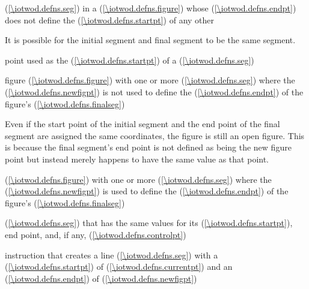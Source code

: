 %
 (\ref{\iotwod.defns.seg}) in a  (\ref{\iotwod.defns.figure}) whose  (\ref{\iotwod.defns.endpt}) does not define the  (\ref{\iotwod.defns.startpt}) of any other 
\begin{note}
It is possible for the initial segment and final segment to be the same segment.
\end{note}

%
point used as the  (\ref{\iotwod.defns.startpt}) of a  (\ref{\iotwod.defns.seg})

%
figure (\ref{\iotwod.defns.figure}) with one or more  (\ref{\iotwod.defns.seg}) where the  (\ref{\iotwod.defns.newfigpt}) is not used to define the  (\ref{\iotwod.defns.endpt}) of the figure's  (\ref{\iotwod.defns.finalseg})
\begin{note}
Even if the start point of the initial segment and the end point of the final segment are assigned the same coordinates, the figure is still an open figure. This is because the final segment's end point is not defined as being the new figure point but instead merely happens to have the same value as that point.
\end{note}

%
 (\ref{\iotwod.defns.figure}) with one or more  (\ref{\iotwod.defns.seg}) where the  (\ref{\iotwod.defns.newfigpt}) is used to define the  (\ref{\iotwod.defns.endpt}) of the figure's  (\ref{\iotwod.defns.finalseg})

%
 (\ref{\iotwod.defns.seg}) that has the same values for its  (\ref{\iotwod.defns.startpt}), end point, and, if any,  (\ref{\iotwod.defns.controlpt})

%
 instruction that creates a line  (\ref{\iotwod.defns.seg}) with a  (\ref{\iotwod.defns.startpt}) of  (\ref{\iotwod.defns.currentpt}) and an  (\ref{\iotwod.defns.endpt}) of  (\ref{\iotwod.defns.newfigpt})

